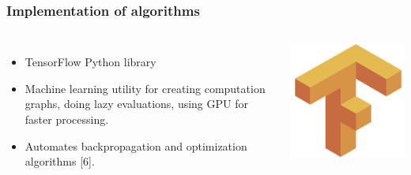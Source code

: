 \documentclass{beamer}
\begin{document}
\begin{frame}
	\frametitle{Implementation of algorithms}
	\begin{columns}
		\begin{itemize}
			\item
				TensorFlow Python library
			\item
				Machine learning utility for creating computation graphs, doing lazy evaluations, using GPU for faster processing.
			\item
				Automates backpropagation and optimization algorithms [6].
		\end{itemize}
		\includegraphics[width=\textwidth]{images/tensorflow.png}
	\end{columns}
\end{frame}
\end{document}
